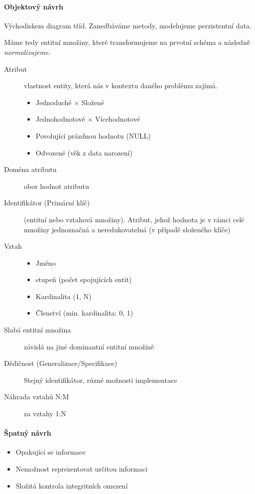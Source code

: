 \documentclass[a4paper, 11pt]{report}
\begin{document}
\paragraph{Objektový návrh}
Východiskem diagram tříd. Zanedbáváme metody, modelujeme perzistentní data.

Máme tedy entitní množiny, které transformujeme na prvotní schéma a následně \emph{normalizujeme}.

\begin{description}
	\item[Atribut] vlastnost entity, která nás v kontextu daného problému zajímá.
	\begin{itemize}
		\item Jednoduché $\times$ Složené
		\item Jednohodnotové $\times$ Vícehodnotové
		\item Povolující prázdnou hodnotu (NULL)
		\item Odvozené (věk z data narození)
	\end{itemize}
	\item[Doména atributu] obor hodnot atributu
	\item[Identifikátor (Primární klíč)] (entitní nebo vztahová množiny). Atribut, jehož hodnota je v rámci celé množiny jednoznačná a neredukovatelná (v případě složeného klíče)
	\item[Vztah] \hfill
	\begin{itemize}
		\item Jméno
		\item stupeň (počet spojujících entit)
		\item Kardinalita (1, N)
		\item Členství (min. kardinalita: 0, 1)
	\end{itemize}
	\item[Slabá entitní množina] závislá na jiné dominantní entitní množině
	\item[Dědičnost (Generalizace/Specifikace)] Stejný identifikátor, různé možnosti implementace
	\item[Náhrada vztahů N:M] za vztahy 1:N
\end{description}

\paragraph{Špatný návrh}
\begin{itemize}
	\item Opakující se informace
	\item Nemožnost reprezentovat určitou informaci
	\item Složitá kontrola integritních omezení
\end{itemize}
\end{document}
